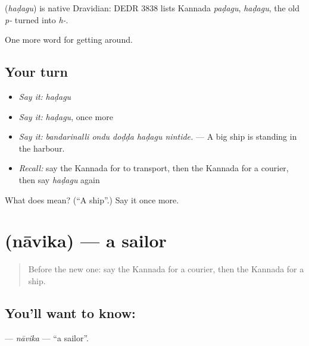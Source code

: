 \begin{cousinweb}
\textbf{} (\emph{haḍagu}) is native Dravidian: DEDR 3838 lists Kannada \emph{paḍagu}, \emph{haḍagu}, the old \emph{p-} turned into \emph{h-}.
\end{cousinweb}

\begin{grammarlens}[title={What you've built}]
One more word for getting around.
\end{grammarlens}

\subsection*{Your turn}
\begin{itemize}
\raggedright
  \item \emph{Say it:} \emph{haḍagu}
  \item \emph{Say it:} \emph{haḍagu}, once more
  \item \emph{Say it:} \emph{bandarinalli ondu doḍḍa haḍagu nintide.} — A big ship is standing in the harbour.
  \item \emph{Recall:} say the Kannada for to transport, then the Kannada for a courier, then say \emph{haḍagu} again
\end{itemize}

\begin{tcolorbox}[breakable,colback=teal!4,colframe=teal!35!black,title={Before you move on}]
What does  mean? (\textquotedblleft{}A ship\textquotedblright{}.) Say it once more.
\end{tcolorbox}
\section[\texorpdfstring{\kn{ನಾವಿಕ} (nāvika)}{ನಾವಿಕ (nāvika)}]{ (nāvika) — a sailor}

\label{lesson:KA-C453-navika}



\begin{quote}
Before the new one: say the Kannada for a courier, then the Kannada for a ship.
\end{quote}

\subsection*{You'll want to know: }
\textbf{} — \emph{nāvika} — \textquotedblleft{}a sailor\textquotedblright{}.

